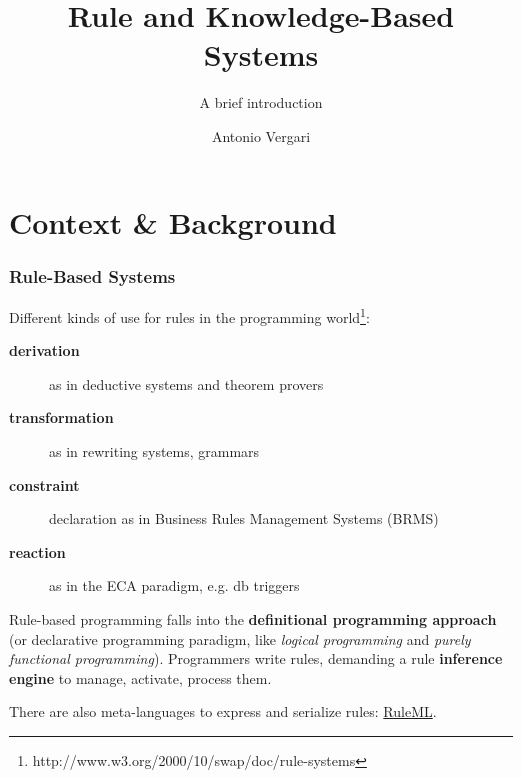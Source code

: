 \documentclass[xcolor={usenames,dvipsnames,svgnames}, compress]{beamer}
\begin{document}
\title{Rule and Knowledge-Based Systems}
\subtitle{A brief introduction}
\author{Antonio Vergari}

\footnotesize \let\small\footnotesize





{
  \begin{frame}
    \titlepage
  \end{frame}
}


\section{Context \& Background}
{
  \begin{frame}
    \sectionpage
  \end{frame}
}

\begin{frame}
  \frametitle{Rule-Based Systems}
  
  Different kinds of use for rules in the programming world\footnote{http://www.w3.org/2000/10/swap/doc/rule-systems}:
  \begin{description}
  \item[\textbf{derivation}] as in deductive systems and theorem provers
  \item[\textbf{transformation}] as in rewriting systems, grammars
  \item[\textbf{constraint}] declaration as in Business Rules Management Systems (BRMS)
  \item[\textbf{reaction}] as in the \textsf{ECA} paradigm, e.g. db triggers
  \end{description}\bigskip
  
  
  Rule-based programming falls into the \textbf{definitional programming
  approach} (or declarative programming paradigm, like \emph{logical programming} and
  \emph{purely functional programming}). Programmers write rules,
  demanding a rule \textbf{inference engine} to manage, activate,
  process them.\par\bigskip
  
  There are also meta-languages to express and serialize rules: \href{http://wiki.ruleml.org/index.php/RuleML_Home}{\textsf{RuleML}}.
\end{frame}
\end{document}
